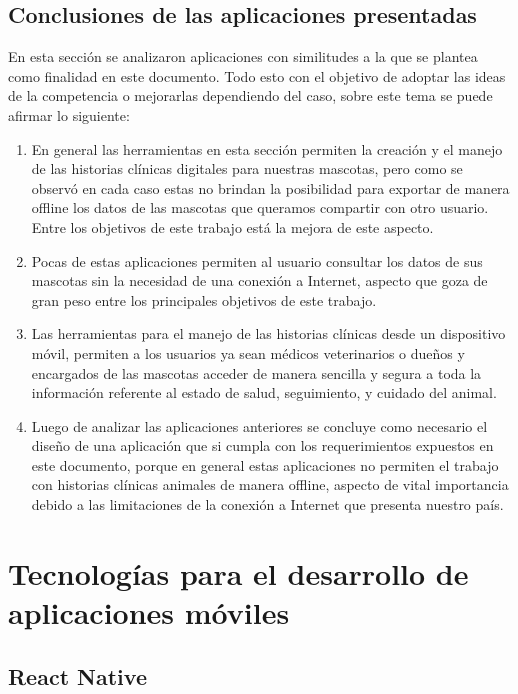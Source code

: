\subsection{Conclusiones de las aplicaciones presentadas}\label{chapter:introduction}

En esta sección se analizaron aplicaciones con similitudes a la que se plantea como finalidad en este documento. Todo esto con el objetivo de adoptar las ideas de la competencia o mejorarlas dependiendo del caso, sobre este tema se puede afirmar lo siguiente:

\begin{enumerate}


\item	En general las herramientas en esta sección permiten la creación y el manejo de las historias clínicas digitales para nuestras mascotas, pero como se observó en cada caso estas no brindan la posibilidad para exportar de manera offline los datos de las mascotas que queramos compartir con otro usuario. Entre los objetivos de este trabajo está la mejora de este aspecto.
\item	Pocas de estas aplicaciones permiten al usuario consultar los datos de sus mascotas sin la necesidad de una conexión a Internet, aspecto que goza de gran peso entre los principales objetivos de este trabajo.
\item	Las herramientas para el manejo de las historias clínicas desde un dispositivo móvil, permiten a los usuarios ya sean médicos veterinarios o dueños y encargados de las mascotas acceder de manera sencilla y segura a toda la información referente al estado de salud, seguimiento, y cuidado del animal.
\item	Luego de analizar las aplicaciones anteriores se concluye como necesario el diseño de una aplicación que si cumpla con los requerimientos expuestos en este documento, porque en general estas aplicaciones no permiten el trabajo con historias clínicas animales de manera offline, aspecto de vital importancia debido a las limitaciones de la conexión a Internet que presenta nuestro país.
\end{enumerate}

\section{Tecnologías para el desarrollo de aplicaciones móviles}\label{chapter:introduction}

\subsection{React Native}\label{chapter:introduction}



